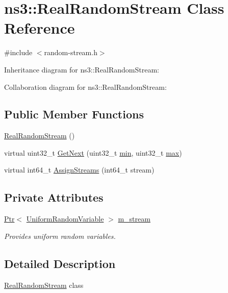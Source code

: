 \hypertarget{classns3_1_1RealRandomStream}{}\section{ns3\+:\+:Real\+Random\+Stream Class Reference}
\label{classns3_1_1RealRandomStream}


{\ttfamily \#include $<$random-\/stream.\+h$>$}



Inheritance diagram for ns3\+:\+:Real\+Random\+Stream\+:


Collaboration diagram for ns3\+:\+:Real\+Random\+Stream\+:
\subsection*{Public Member Functions}
\begin{DoxyCompactItemize}
\item 
\hyperlink{classns3_1_1RealRandomStream_ac9c0f4632c93d8bc2db53e8c18ace41e}{Real\+Random\+Stream} ()
\item 
virtual uint32\+\_\+t \hyperlink{classns3_1_1RealRandomStream_a485d5988d92a91010acb5f282cc4b9a8}{Get\+Next} (uint32\+\_\+t \hyperlink{80211b_8c_ac6afabdc09a49a433ee19d8a9486056d}{min}, uint32\+\_\+t \hyperlink{80211b_8c_affe776513b24d84b39af8ab0930fef7f}{max})
\item 
virtual int64\+\_\+t \hyperlink{classns3_1_1RealRandomStream_a9bd30c3f788ef472fec5e65063062ed2}{Assign\+Streams} (int64\+\_\+t stream)
\end{DoxyCompactItemize}
\subsection*{Private Attributes}
\begin{DoxyCompactItemize}
\item 
\hyperlink{classns3_1_1Ptr}{Ptr}$<$ \hyperlink{classns3_1_1UniformRandomVariable}{Uniform\+Random\+Variable} $>$ \hyperlink{classns3_1_1RealRandomStream_ae2f76b185f06373e4bdfa41029083088}{m\+\_\+stream}
\begin{DoxyCompactList}\small\item\em Provides uniform random variables. \end{DoxyCompactList}\end{DoxyCompactItemize}


\subsection{Detailed Description}
\hyperlink{classns3_1_1RealRandomStream}{Real\+Random\+Stream} class 

